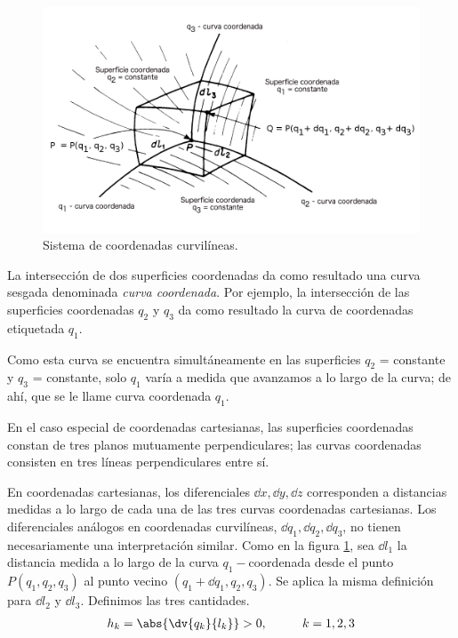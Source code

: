 \begin{figure}[H]
    \centering
    \includegraphics[scale=0.35]{Imagenes/CoordenadasCurvilineas_01.png}
    \caption{Sistema de coordenadas curvilíneas.}
    \label{fig:figura_A_01}
\end{figure}
La intersección de dos superficies coordenadas da como resultado una curva sesgada denominada \emph{curva coordenada}. Por ejemplo, la intersección de las superficies coordenadas $q_{2}$ y $q_{3}$ da como resultado la curva de coordenadas etiquetada $q_{1}$.
\par
Como esta curva se encuentra simultáneamente en las superficies $q_{2}$ = constante y $q_{3}$ = constante, solo $q_{1}$ varía a medida que avanzamos a lo largo de la curva; de ahí, que se le llame curva coordenada $q_{1}$.
\par
En el caso especial de coordenadas cartesianas, las superficies coordenadas constan de tres planos mutuamente perpendiculares; las curvas coordenadas consisten en tres líneas perpendiculares entre sí.
\par
En coordenadas cartesianas, los diferenciales $\dd{x}, \dd{y}, \dd{z}$ corresponden a distancias medidas a lo largo de cada una de las tres curvas coordenadas cartesianas. Los diferenciales análogos en coordenadas curvilíneas, $\dd{q_{1}}, \dd{q_{2}}, \dd{q_{3}}$, no tienen necesariamente una interpretación similar. Como en la figura \ref{fig:figura_A_01}, sea $\dd{l_{1}}$ la distancia medida a lo largo de la curva $q_{1}-$coordenada desde el punto $P (q_{1}, q_{2}, q_{3})$ al punto vecino $(q_{1} + \dd{q_{1}}, q_{2}, q_{3})$. Se aplica la misma definición para $\dd{l_{2}}$ y $\dd{l_{3}}$. Definimos las tres cantidades.
\begin{align}
h_{k} =  \abs{\dv{q_{k}}{l_{k}}} > 0, \hspace{1cm} k = 1, 2, 3
\label{eq:ecuacion_A_01_04}    
\end{align}
